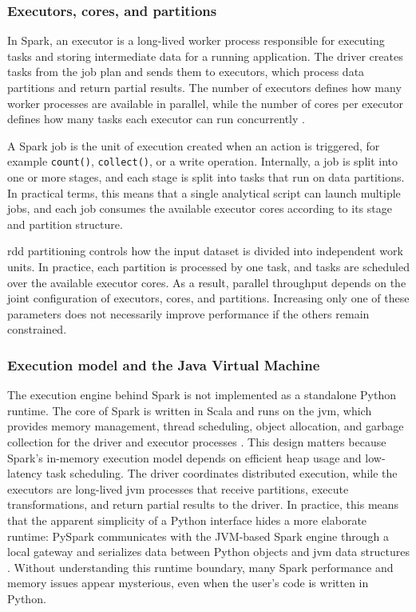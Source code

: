 \subsubsection{Executors, cores, and partitions}
\label{subsubsec:cap2-executors-cores-and-partitions}

In Spark, an executor is a long-lived worker process responsible for executing tasks and storing intermediate data for a running application. The driver creates tasks from the job plan and sends them to executors, which process data partitions and return partial results. The number of executors defines how many worker processes are available in parallel, while the number of cores per executor defines how many tasks each executor can run concurrently \parencite{sparkpysparkdocs}.

A Spark job is the unit of execution created when an action is triggered, for example \texttt{count()}, \texttt{collect()}, or a write operation. Internally, a job is split into one or more stages, and each stage is split into tasks that run on data partitions. In practical terms, this means that a single analytical script can launch multiple jobs, and each job consumes the available executor cores according to its stage and partition structure.

\gls{rdd} partitioning controls how the input dataset is divided into independent work units. In practice, each partition is processed by one task, and tasks are scheduled over the available executor cores. As a result, parallel throughput depends on the joint configuration of executors, cores, and partitions. Increasing only one of these parameters does not necessarily improve performance if the others remain constrained.

\subsubsection{Execution model and the Java Virtual Machine}
\label{subsubsec:cap2-execution-model-and-the-java-virtual-machine}

The execution engine behind Spark is not implemented as a standalone Python runtime. The core of Spark is written in Scala and runs on the \gls{jvm}, which provides memory management, thread scheduling, object allocation, and garbage collection for the driver and executor processes \parencite{oraclejvm2024}. This design matters because Spark's in-memory execution model depends on efficient heap usage and low-latency task scheduling. The driver coordinates distributed execution, while the executors are long-lived \gls{jvm} processes that receive partitions, execute transformations, and return partial results to the driver. In practice, this means that the apparent simplicity of a Python interface hides a more elaborate runtime: PySpark communicates with the JVM-based Spark engine through a local gateway and serializes data between Python objects and \gls{jvm} data structures \parencite{sparkpysparkdocs,oraclejvm2024}. Without understanding this runtime boundary, many Spark performance and memory issues appear mysterious, even when the user's code is written in Python.

